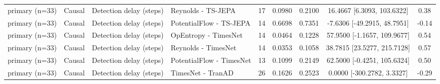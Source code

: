 \begin{table}[t]
\begin{tabular}{@{}llllccccc@{}}
primary (n=33) & Causal & Detection delay (steps) & Reynolds - TS-JEPA & 17 & 0.0980 & 0.2100 & 16.4667 [6.3093, 103.6322] & 0.38 \\
primary (n=33) & Causal & Detection delay (steps) & PotentialFlow - TS-JEPA & 14 & 0.6698 & 0.7351 & -7.6306 [-49.2915, 48.7951] & -0.14 \\
primary (n=33) & Causal & Detection delay (steps) & OpEntropy - TimesNet & 14 & 0.0464 & 0.1228 & 57.9500 [-1.1657, 109.9677] & 0.54 \\
primary (n=33) & Causal & Detection delay (steps) & Reynolds - TimesNet & 14 & 0.0353 & 0.1058 & 38.7815 [23.5277, 215.7128] & 0.57 \\
primary (n=33) & Causal & Detection delay (steps) & PotentialFlow - TimesNet & 13 & 0.1099 & 0.2149 & 62.5000 [-0.4251, 105.6324] & 0.50 \\
primary (n=33) & Causal & Detection delay (steps) & TimesNet - TranAD & 26 & 0.1626 & 0.2523 & 0.0000 [-300.2782, 3.3327] & -0.29 \\
\bottomrule
\end{tabular}
\end{table}
